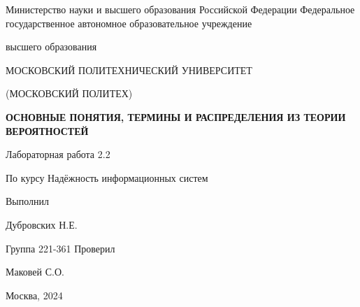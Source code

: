 \singlespacing

\newpage
\begin{center}
    Министерство науки и высшего образования Российской Федерации
    Федеральное государственное автономное образовательное учреждение

    высшего образования

    \guillemotleft МОСКОВСКИЙ ПОЛИТЕХНИЧЕСКИЙ УНИВЕРСИТЕТ\guillemotright

    (МОСКОВСКИЙ ПОЛИТЕХ)
\end{center}
\noindent
\bigbreak
\bigbreak
\bigbreak
\bigbreak
\begin{center}
    \textbf{ОСНОВНЫЕ ПОНЯТИЯ, ТЕРМИНЫ И РАСПРЕДЕЛЕНИЯ ИЗ
ТЕОРИИ ВЕРОЯТНОСТЕЙ}
    \bigskip
    \bigskip
    \bigskip
    \bigskip
    \bigskip

    Лабораторная работа 2.2

    По курсу \guillemotleft Надёжность информационных систем\guillemotright
    \bigskip

    \bigbreak
    \bigbreak
    \bigbreak
    \bigbreak
\end{center}
\noindent
\bigbreak
\bigbreak
\bigbreak
\bigbreak
\bigbreak
\bigbreak
\bigbreak
\bigbreak
\bigbreak
\bigbreak
\hfill Выполнил

\hfill Дубровских Н.Е.

\hfill Группа 221-361
\bigbreak
\bigbreak
\bigbreak
\hfill Проверил

\hfill Маковей С.О.
\vfill
\begin{center}
    Москва, 2024
\end{center}
\newpage
\onehalfspacing
